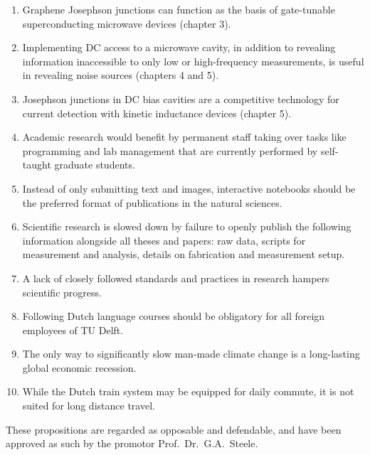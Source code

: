 \documentclass{dissertation-edit}
\begin{document}
\begin{enumerate}

\item Graphene Josephson junctions can function as the basis of gate-tunable superconducting microwave devices (chapter 3).
%
\item Implementing DC access to a microwave cavity, in addition to revealing information inaccessible to only low or high-frequency measurements, is useful in revealing noise sources (chapters 4 and 5).
%
\item Josephson junctions in DC bias cavities are a competitive technology for current detection with kinetic inductance devices (chapter 5).
%
\item Academic research would benefit by permanent staff taking over tasks like programming and lab management that are currently performed by self-taught graduate students.
%
\item Instead of only submitting text and images, interactive notebooks should be the preferred format of publications in the natural sciences.
%
\item Scientific research is slowed down by failure to openly publish the following information alongside all theses and papers: raw data, scripts for measurement and analysis, details on fabrication and measurement setup.
%
\item A lack of closely followed standards and practices in research hampers scientific progress.
%
\item Following Dutch language courses should be obligatory for all foreign employees of TU Delft.
%
\item The only way to significantly slow man-made climate change is a long-lasting global economic recession.
%
\item While the Dutch train system may be equipped for daily commute, it is not suited for long distance travel.

\end{enumerate}

\bigskip
\bigskip

\begin{center}
These propositions are regarded as opposable and defendable, and have been approved as such by the promotor Prof.~Dr.~G.A.~Steele.
\end{center}
\end{document}
